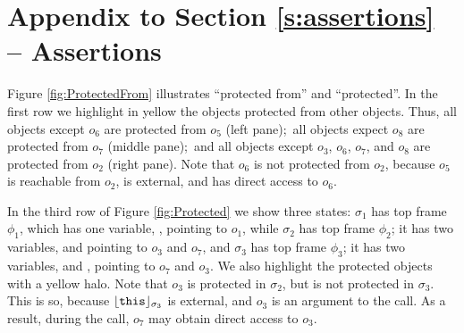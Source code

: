 \section{Appendix to Section \ref{s:assertions} -- Assertions}
\label{appendix:assertions}

Figure \ref{fig:ProtectedFrom} illustrates ``protected from'' and ``protected''. %
In the first row  we  highlight in yellow  the objects protected from other objects. Thus, all objects except $o_6$ are protected from $o_5$ (left pane);\ all objects expect $o_8$ are protected from $o_7$ (middle pane);\ and all objects except $o_3$, $o_6$, $o_7$, and $o_8$ are protected from $o_2$ (right pane). 
Note  that $o_6$ is not protected from $o_2$, because  $o_5$ is reachable from $o_2$, is external, and has direct access to $o_6$.

In the third row of   Figure \ref{fig:Protected} we show three states: 
 $\sigma_1$ has  top frame $\phi_1$, which has  one variable, , pointing to $o_1$, while 
 $\sigma_2$ has  top frame $\phi_2$; it has two  variables,    and  pointing to $o_3$ and  $o_7$, and 
 $\sigma_3$ has  top frame $\phi_3$; it has two  variables,   and , pointing to $o_7$ and $o_3$.  
% 
We also   highlight the protected objects with a yellow halo.
 Note that $o_3$ is protected in $\sigma_2$, but is not protected in $\sigma_3$. This is so, because $\interpret {\sigma_3} {\prg{this}}$  is external, and  $o_3$ is an argument to the call. As a result, during the call, $o_7$ may obtain direct access to $o_3$. 
 
